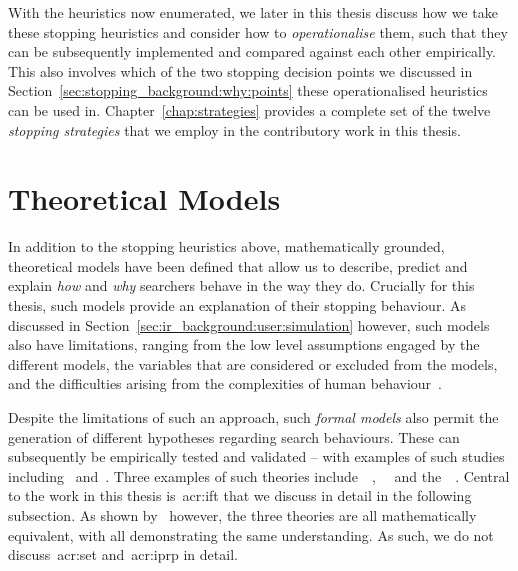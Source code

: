With the heuristics now enumerated, we later in this thesis discuss how we take these stopping heuristics and consider how to \emph{operationalise} them, such that they can be subsequently implemented and compared against each other empirically. This also involves which of the two stopping decision points we discussed in Section~\ref{sec:stopping_background:why:points} these operationalised heuristics can be used in. Chapter~\ref{chap:strategies} provides a complete set of the twelve \emph{stopping strategies} that we employ in the contributory work in this thesis.

\section{Theoretical Models}\label{sec:stopping_background:theoretical}
In addition to the stopping heuristics above, mathematically grounded, theoretical models have been defined that allow us to describe, predict and explain \emph{how} and \emph{why} searchers behave in the way they do. Crucially for this thesis, such models provide an explanation of their stopping behaviour. As discussed in Section~\ref{sec:ir_background:user:simulation} however, such models also have limitations, ranging from the low level assumptions engaged by the different models, the variables that are considered or excluded from the models, and the difficulties arising from the complexities of human behaviour~\citep{fishwick1995simulation, azzopardi2015theories}.

Despite the limitations of such an approach, such \emph{formal models} also permit the generation of different hypotheses regarding search behaviours. These can subsequently be empirically tested and validated -- with examples of such studies including~\cite{azzopardi2013query_cost} and~\cite{pirolli1996scatter_techniques}. Three examples of such theories include~~\citep{pirolli1999ift},~~\citep{azzopardi2011economics} and the~~\citep{fuhr2008iprp}. Central to the work in this thesis is~\gls{acr:ift} that we discuss in detail in the following subsection. As shown by~\cite{azzopardi2015theories} however, the three theories are all mathematically equivalent, with all demonstrating the same understanding. As such, we do not discuss~\gls{acr:set} and~\gls{acr:iprp} in detail.



